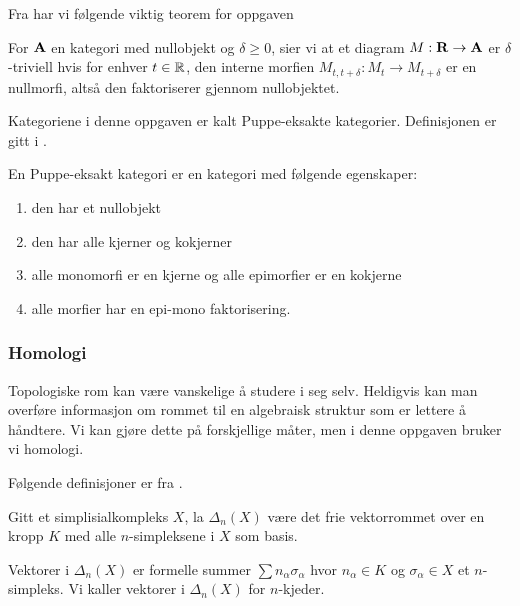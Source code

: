 Fra \citep[definisjon 1.3]{Bauer2020} har vi følgende
viktig teorem for oppgaven

\begin{definisjon}\label{def:trivialitet}
   For $\textnormal{\textbf{{A}}}$ en kategori med nullobjekt og
   $\delta\geq0$, sier vi at et diagram $M:\textnormal{\textbf{{R}}}\to\textnormal{\textbf{{A}}}$
   er $\delta$-triviell hvis for enhver $t\in\mathbb{R}$, den
   interne morfien $M_{t,t+\delta}: M_t\to M_{t+\delta}$
   er en nullmorfi, altså den faktoriserer gjennom
   nullobjektet.
\end{definisjon}

Kategoriene i denne oppgaven er kalt Puppe-eksakte
kategorier. Definisjonen er gitt i \citep[definisjon
2.1]{Bauer2020}.

\begin{definisjon}\label{def:Puppe-eksakt}
   En Puppe-eksakt kategori er en kategori med følgende
   egenskaper:
  \begin{enumerate}
    \item den har et nullobjekt
    \item den har alle kjerner og kokjerner
    \item alle monomorfi er en kjerne og alle epimorfier
      er en kokjerne
    \item alle morfier har en epi-mono faktorisering.
  \end{enumerate}
\end{definisjon}

\subsubsection{Homologi}
Topologiske rom kan være vanskelige å studere i seg selv.
Heldigvis kan man overføre informasjon om rommet til en algebraisk
struktur som er lettere å håndtere. Vi kan gjøre dette på
forskjellige måter, men i denne oppgaven bruker vi
homologi. 

Følgende definisjoner er fra \citep[seksjon
2.1]{Hatcher2001}.

\begin{definisjon}\label{def:KjdKomp}
  Gitt et simplisialkompleks $X$, la $\Delta_n(X)$ være
  det frie vektorrommet over en kropp $K$ med alle
  $n$-simpleksene i $X$ som basis.
\end{definisjon}

Vektorer i $\Delta_n(X)$ er formelle summer $\sum
n_\alpha\sigma_\alpha$ hvor $n_\alpha\in K$ og
$\sigma_\alpha\in X$ et $n$-simpleks. Vi kaller vektorer
i $\Delta_n(X)$ for $n$-kjeder. 

